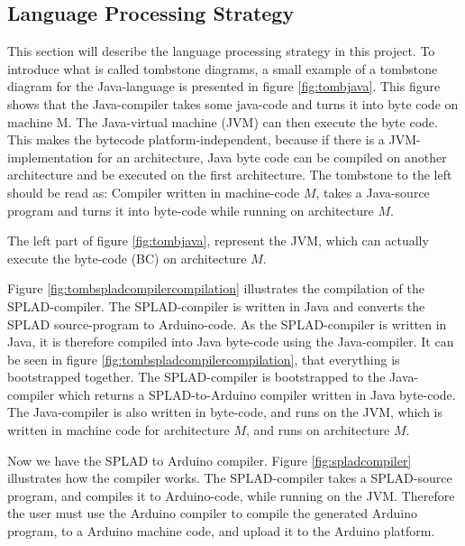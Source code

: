 \subsection{Language Processing Strategy}
\label{sec:LanguageProcessingStrategy}
This section will describe the language processing strategy in this project. To introduce what is called tombstone diagrams, a small example of a tombstone diagram for the Java-language is presented in figure \ref{fig:tombjava}. This figure shows that the Java-compiler takes some java-code and turns it into byte code on machine M. The Java-virtual machine (JVM) can then execute the byte code. This makes the bytecode platform-independent, because if there is a JVM-implementation for an architecture, Java byte code can be compiled on another architecture and be executed on the first architecture. The tombstone to the left should be read as: Compiler written in machine-code $M$, takes a Java-source program and turns it into byte-code while running on architecture $M$.


The left part of figure \ref{fig:tombjava}, represent the JVM, which can actually execute the byte-code (BC) on architecture $M$.

Figure \ref{fig:tombspladcompilercompilation} illustrates the compilation of the SPLAD-compiler. The SPLAD-compiler is written in Java and converts the SPLAD source-program to Arduino-code. As the SPLAD-compiler is written in Java, it is therefore compiled into Java byte-code using the Java-compiler. It can be seen in figure \ref{fig:tombspladcompilercompilation}, that everything is bootstrapped together. The SPLAD-compiler is bootstrapped to the Java-compiler which returns a SPLAD-to-Arduino compiler written in Java byte-code. The Java-compiler is also written in byte-code, and runs on the JVM, which is written in machine code for architecture $M$, and runs on architecture $M$.

Now we have the SPLAD to Arduino compiler. Figure \ref{fig:spladcompiler} illustrates how the compiler works. The SPLAD-compiler takes a SPLAD-source program, and compiles it to Arduino-code, while running on the JVM. Therefore the user must use the Arduino compiler to compile the generated Arduino program, to a Arduino machine code, and upload it to the Arduino platform. 
